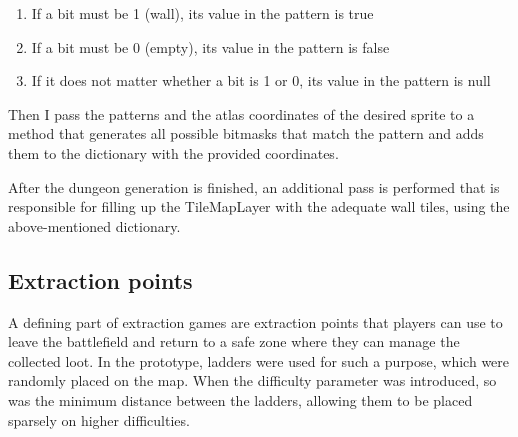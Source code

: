 \begin{enumerate}
  \item If a bit must be 1 (wall), its value in the pattern is true
  \item If a bit must be 0 (empty), its value in the pattern is false
  \item If it does not matter whether a bit is 1 or 0, its value in the pattern is null
\end{enumerate}

Then I pass the patterns and the atlas coordinates of the desired sprite to a method that generates all possible bitmasks that match the pattern and adds them to the dictionary with the provided coordinates.

After the dungeon generation is finished, an additional pass is performed that is responsible for filling up the TileMapLayer with the adequate wall tiles, using the above-mentioned dictionary.

\subsection{Extraction points}

A defining part of extraction games are extraction points that players can use to leave the battlefield and return to a safe zone where they can manage the collected loot. In the prototype, ladders were used for such a purpose, which were randomly placed on the map. When the difficulty parameter was introduced, so was the minimum distance between the ladders, allowing them to be placed sparsely on higher difficulties.

